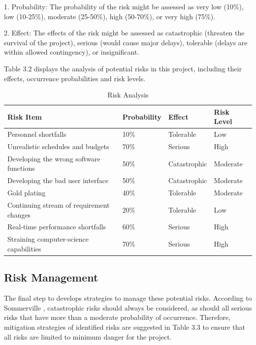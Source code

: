 1.	Probability: The probability of the risk might be assessed as very low (10\%), low (10-25\%), moderate (25-50\%), high (50-70\%), or very high (75\%).

2.	Effect: The effects of the risk might be assessed as catastrophic (threaten the survival of the project), serious (would cause major delays), tolerable (delays are within allowed contingency), or insignificant.

Table 3.2 displays the analysis of potential risks in this project, including their effects, occurrence probabilities and risk levels. 

\begin{table}[H]
\centering
\caption{Risk Analysis}
\label{my-label}
\begin{tabular}{|p{4cm}|p{3cm}|p{3cm}|p{3cm}|}
\hline
\textbf{Risk Item}                       & \textbf{Probability} & \textbf{Effect} & \textbf{Risk Level} \\ \hline
Personnel shortfalls                     & 10\%                 & Tolerable       & Low                 \\ \hline
Unrealistic schedules and budgets        & 70\%                 & Serious         & High                \\ \hline
Developing the wrong software functions  & 50\%                 & Catastrophic    & Moderate            \\ \hline
Developing the bad user interface        & 50\%                 & Catastrophic    & Moderate            \\ \hline
Gold plating                             & 40\%                 & Tolerable       & Moderate            \\ \hline
Continuing stream of requirement changes & 20\%                 & Tolerable       & Low                 \\ \hline
Real-time performance shortfalls         & 60\%                 & Serious         & High                \\ \hline
Straining computer-science capabilities  & 70\%                 & Serious         & High                \\ \hline
\end{tabular}
\end{table}

\subsection{Risk Management}

The final step to develops strategies to manage these potential risks. According to Sommerville \cite{5_sommerville_2011}, catastrophic risks should always be considered, as should all serious risks that have more than a moderate probability of occurrence. Therefore, mitigation strategies of identified risks are suggested in Table 3.3 to ensure that all risks are limited to minimum danger for the project.

